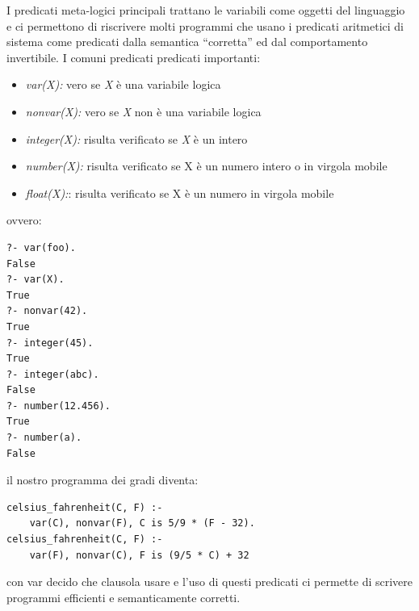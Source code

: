 \documentclass[a4paper]{book}
\begin{document}
I predicati meta-logici principali trattano le variabili come oggetti del linguaggio e ci permettono di riscrivere molti programmi
che usano i predicati aritmetici di sistema come predicati dalla semantica “corretta” ed dal comportamento invertibile.\newline
I comuni predicati predicati importanti:
\begin{itemize}
\item \textit{var(X):}  vero se \textit{X} è una variabile logica
\item \textit{nonvar(X):}  vero se \textit{X} non è una variabile logica
\item \textit{integer(X):} risulta verificato se \textit{X} è un intero
\item \textit{number(X):} risulta verificato se X è un numero intero o in virgola mobile
\item \textit{float(X):}: risulta verificato se X è un numero in virgola mobile
\end{itemize}
ovvero:
\begin{verbatim}
?- var(foo).
False
?- var(X).
True
?- nonvar(42).
True
?- integer(45).
True
?- integer(abc).
False
?- number(12.456).
True
?- number(a).
False
\end{verbatim}
il nostro programma dei gradi diventa:
\begin{verbatim}
celsius_fahrenheit(C, F) :-
	var(C), nonvar(F), C is 5/9 * (F - 32).
celsius_fahrenheit(C, F) :-
	var(F), nonvar(C), F is (9/5 * C) + 32
\end{verbatim}
con var decido che clausola usare e l'uso di questi predicati ci permette di scrivere programmi efficienti e semanticamente corretti.
\end{document}
